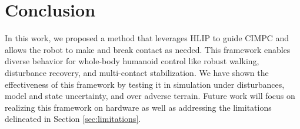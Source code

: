 \section{Conclusion}\label{sec:conclusion}
In this work, we proposed a method that leverages HLIP to guide CIMPC and allows the robot to make and break contact as needed. This framework enables diverse behavior for whole-body humanoid control like robust walking, disturbance recovery, and multi-contact stabilization. We have shown the effectiveness of this framework by testing it in simulation under disturbances, model and state uncertainty, and over adverse terrain. Future work will focus on realizing this framework on hardware as well as addressing the limitations delineated in Section \ref{sec:limitations}.